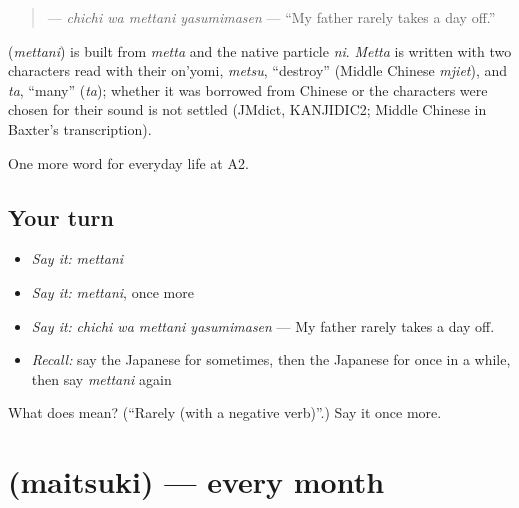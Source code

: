 \begin{quote}
\textbf{  } — \emph{chichi wa mettani yasumimasen} — \textquotedblleft{}My father rarely takes a day off.\textquotedblright{}
\end{quote}

\begin{cousinweb}
\textbf{} (\emph{mettani}) is built from \emph{metta} and the native particle \emph{ni}. \emph{Metta} is written with two characters read with their on'yomi, \emph{metsu}, \textquotedblleft{}destroy\textquotedblright{} (Middle Chinese \emph{mjiet}), and \emph{ta}, \textquotedblleft{}many\textquotedblright{} (\emph{ta}); whether it was borrowed from Chinese or the characters were chosen for their sound is not settled (JMdict, KANJIDIC2; Middle Chinese in Baxter's transcription).
\end{cousinweb}

\begin{grammarlens}[title={What you've built}]
One more word for everyday life at A2.
\end{grammarlens}

\subsection*{Your turn}
\begin{itemize}
\raggedright
  \item \emph{Say it:} \emph{mettani}
  \item \emph{Say it:} \emph{mettani}, once more
  \item \emph{Say it:} \emph{chichi wa mettani yasumimasen} — My father rarely takes a day off.
  \item \emph{Recall:} say the Japanese for sometimes, then the Japanese for once in a while, then say \emph{mettani} again
\end{itemize}

\begin{tcolorbox}[breakable,colback=teal!4,colframe=teal!35!black,title={Before you move on}]
What does  mean? (\textquotedblleft{}Rarely (with a negative verb)\textquotedblright{}.) Say it once more.
\end{tcolorbox}
\section[\texorpdfstring{\ja{まいつき} (maitsuki)}{まいつき (maitsuki)}]{ (maitsuki) — every month}


